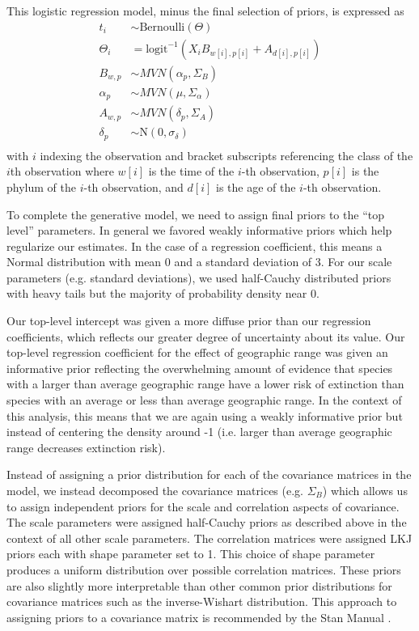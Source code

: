 \documentclass[12pt,letterpaper]{article}
\begin{document}
This logistic regression model, minus the final selection of priors, is expressed as 
\begin{equation}
  \begin{aligned}
    t_{i} &\sim \text{Bernoulli}(\Theta) \\
    \Theta_{i} &= \text{logit}^{-1} (X_{i} B_{w[i], p[i]} + A_{d[i], p[i]}) \\
    B_{w, p} &\sim MVN(\alpha_{p}, \Sigma_{B}) \\
    \alpha_{p} &\sim MVN(\mu, \Sigma_{\alpha}) \\
    A_{w, p} &\sim MVN(\delta_{p}, \Sigma_{A}) \\
    \delta_{p} &\sim \mathrm{N}(0, \sigma_{\delta}) \\
  \end{aligned}
  \label{eq:core}
\end{equation}
with \(i\) indexing the observation and bracket subscripts referencing the class of the \(i\)th observation where \(w[i]\) is the time of the \(i\)-th observation, \(p[i]\) is the phylum of the \(i\)-th observation, and \(d[i]\) is the age of the \(i\)-th observation. 

To complete the generative model, we need to assign final priors to the ``top level'' parameters. In general we favored weakly informative priors which help regularize our estimates. In the case of a regression coefficient, this means a Normal distribution with mean 0 and a standard deviation of 3. For our scale parameters (e.g. standard deviations), we used half-Cauchy distributed priors with heavy tails but the majority of probability density near 0.

Our top-level intercept was given a more diffuse prior than our regression coefficients, which reflects our greater degree of uncertainty about its value. Our top-level regression coefficient for the effect of geographic range was given an informative prior reflecting the overwhelming amount of evidence that species with a larger than average geographic range have a lower risk of extinction than species with an average or less than average geographic range. In the context of this analysis, this means that we are again using a weakly informative prior but instead of centering the density around -1 (i.e. larger than average geographic range decreases extinction risk).

Instead of assigning a prior distribution for each of the covariance matrices in the model, we instead decomposed the covariance matrices (e.g. \(\Sigma_{B}\)) which allows us to assign independent priors for the scale and correlation aspects of covariance. The scale parameters were assigned half-Cauchy priors as described above in the context of all other scale parameters. The correlation matrices were assigned LKJ priors each with shape parameter set to 1. This choice of shape parameter produces a uniform distribution over possible correlation matrices. These priors are also slightly more interpretable than other common prior distributions for covariance matrices such as the inverse-Wishart distribution. This approach to assigning priors to a covariance matrix is recommended by the Stan Manual \citep{StanManual}.
\end{document}
